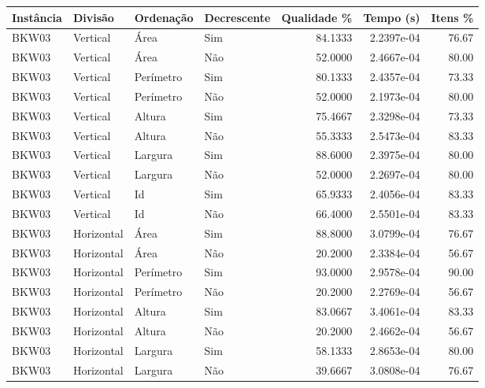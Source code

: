 \begin{tabular}{llllrrr}
    \hline
    Instância & Divisão     & Ordenação & Decrescente & Qualidade \% & Tempo (s)  & Itens \% \\
    \hline
    BKW03     & Vertical    & Área      & Sim         & 84.1333      & 2.2397e-04 & 76.67    \\
    BKW03     & Vertical    & Área      & Não         & 52.0000      & 2.4667e-04 & 80.00    \\
    BKW03     & Vertical    & Perímetro & Sim         & 80.1333      & 2.4357e-04 & 73.33    \\
    BKW03     & Vertical    & Perímetro & Não         & 52.0000      & 2.1973e-04 & 80.00    \\
    BKW03     & Vertical    & Altura    & Sim         & 75.4667      & 2.3298e-04 & 73.33    \\
    BKW03     & Vertical    & Altura    & Não         & 55.3333      & 2.5473e-04 & 83.33    \\
    BKW03     & Vertical    & Largura   & Sim         & 88.6000      & 2.3975e-04 & 80.00    \\
    BKW03     & Vertical    & Largura   & Não         & 52.0000      & 2.2697e-04 & 80.00    \\
    BKW03     & Vertical    & Id        & Sim         & 65.9333      & 2.4056e-04 & 83.33    \\
    BKW03     & Vertical    & Id        & Não         & 66.4000      & 2.5501e-04 & 83.33    \\
    BKW03     & Horizontal  & Área      & Sim         & 88.8000      & 3.0799e-04 & 76.67    \\
    BKW03     & Horizontal  & Área      & Não         & 20.2000      & 2.3384e-04 & 56.67    \\
    BKW03     & Horizontal  & Perímetro & Sim         & 93.0000      & 2.9578e-04 & 90.00    \\
    BKW03     & Horizontal  & Perímetro & Não         & 20.2000      & 2.2769e-04 & 56.67    \\
    BKW03     & Horizontal  & Altura    & Sim         & 83.0667      & 3.4061e-04 & 83.33    \\
    BKW03     & Horizontal  & Altura    & Não         & 20.2000      & 2.4662e-04 & 56.67    \\
    BKW03     & Horizontal  & Largura   & Sim         & 58.1333      & 2.8653e-04 & 80.00    \\
    BKW03     & Horizontal  & Largura   & Não         & 39.6667      & 3.0808e-04 & 76.67    \\

\end{tabular}
